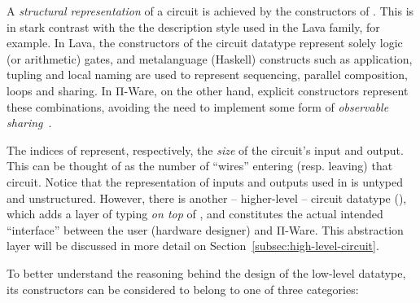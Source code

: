         A \emph{structural representation} of a circuit is achieved by the constructors of .
        This is in stark contrast with the the description style used in the Lava family, for example.
        In Lava, the constructors of the circuit datatype represent solely logic (or arithmetic) gates,
        and metalanguage (Haskell) constructs such as application, tupling and local naming are
        used to represent sequencing, parallel composition, loops and sharing.
        In Π-Ware, on the other hand, explicit constructors represent these combinations,
        avoiding the need to implement some form of \emph{observable sharing}~\cite{gill-typesafe-observable-sharing}.

        The indices of  represent, respectively, the \emph{size} of the circuit's input and output.
        This can be thought of as the number of ``wires'' entering (resp. leaving) that circuit.
        Notice that the representation of inputs and outputs used in  is untyped and unstructured.
        However, there is another -- higher-level -- circuit datatype (),
        which adds a layer of typing \emph{on top} of ,
        and constitutes the actual intended ``interface'' between the user (hardware designer) and Π-Ware.
        This abstraction layer will be discussed in more detail on Section~\ref{subsec:high-level-circuit}.

        To better understand the reasoning behind the design of the low-level  datatype,
        its constructors can be considered to belong to one of three categories:

